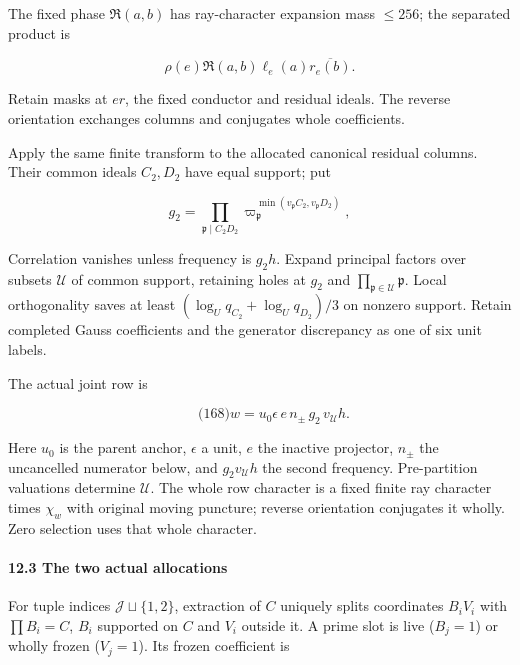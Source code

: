 The fixed phase \(\mathfrak R(a,b)\) has ray-character expansion mass \(\le256\); the separated product is

\[
\rho(e)\mathfrak R(a,b)\ell_e(a)\overline{r_e(b)}.
\]

Retain masks at \(er\), the fixed conductor and residual ideals. The reverse orientation exchanges columns and conjugates whole coefficients.

Apply the same finite transform to the allocated canonical residual columns. Their common ideals \(C_2,D_2\) have equal support; put

\[
g_2=\prod_{\mathfrak p\mid C_2D_2}
                  \varpi_{\mathfrak p}^{\min(v_{\mathfrak p}C_2,
                                                   v_{\mathfrak p}D_2)},
\]

Correlation vanishes unless frequency is \(g_2h\). Expand principal factors over subsets \(\mathcal U\) of common support, retaining holes at \(g_2\) and \(\prod_{\mathfrak p\in\mathcal U}\mathfrak p\). Local orthogonality saves at least \((\log_Uq_{C_2}+\log_Uq_{D_2})/3\) on nonzero support. Retain completed Gauss coefficients and the generator discrepancy as one of six unit labels.

The actual joint row is

\hypertarget{ma:joint-row}{}

\label{ma:joint-row}

\[
\qquad\text{(168)}
 w=u_0\epsilon\,e\,n_\pm\,g_2\,v_{\mathcal U}h.
\]

Here \(u_0\) is the parent anchor, \(\epsilon\) a unit, \(e\) the inactive projector, \(n_\pm\) the uncancelled numerator below, and \(g_2v_{\mathcal U}h\) the second frequency. Pre-partition valuations determine \(\mathcal U\). The whole row character is a fixed finite ray character times \(\chi_w\) with original moving puncture; reverse orientation conjugates it wholly. Zero selection uses that whole character.

\hypertarget{ma:allocations}{}

\label{ma:allocations}

\hypertarget{the-two-actual-allocations}{%
\paragraph{12.3 The two actual allocations}\label{the-two-actual-allocations}}

For tuple indices \(\mathcal J\sqcup\{1,2\}\), extraction of \(C\) uniquely splits coordinates \(B_iV_i\) with \(\prod B_i=C\), \(B_i\) supported on \(C\) and \(V_i\) outside it. A prime slot is live (\(B_j=1\)) or wholly frozen (\(V_j=1\)). Its frozen coefficient is


